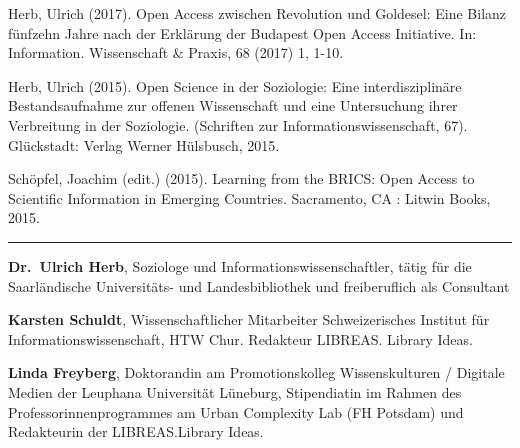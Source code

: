 \documentclass[a4paper,
fontsize=11pt,
oneside,
numbers=noperiodatend,
parskip=half-,
bibliography=totoc,
final
]{scrartcl}
\begin{document}
Herb, Ulrich (2017). Open Access zwischen Revolution und Goldesel: Eine
Bilanz fünfzehn Jahre nach der Erklärung der Budapest Open Access
Initiative. In: Information. Wissenschaft \& Praxis, 68 (2017) 1, 1-10.

Herb, Ulrich (2015). Open Science in der Soziologie: Eine
interdisziplinäre Bestandsaufnahme zur offenen Wissenschaft und eine
Untersuchung ihrer Verbreitung in der Soziologie. (Schriften zur
Informationswissenschaft, 67). Glückstadt: Verlag Werner Hülsbusch,
2015.

Schöpfel, Joachim (edit.) (2015). Learning from the BRICS: Open Access
to Scientific Information in Emerging Countries. Sacramento, CA : Litwin
Books, 2015.

\begin{center}\rule{0.5\linewidth}{\linethickness}\end{center}

\textbf{Dr.~Ulrich Herb}, Soziologe und Informationswissenschaftler,
tätig für die Saarländische Universitäts- und Landesbibliothek und
freiberuflich als Consultant

\textbf{Karsten Schuldt}, Wissenschaftlicher Mitarbeiter Schweizerisches
Institut für Informationswissenschaft, HTW Chur. Redakteur LIBREAS.
Library Ideas.

\textbf{Linda Freyberg}, Doktorandin am Promotionskolleg Wissenskulturen
/ Digitale Medien der Leuphana Universität Lüneburg, Stipendiatin im
Rahmen des Professorinnenprogrammes am Urban Complexity Lab (FH Potsdam)
und Redakteurin der LIBREAS.Library Ideas.
\end{document}
